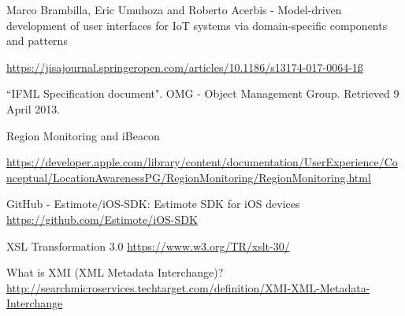 

\begin{thebibliography}{90}

Marco Brambilla, Eric Umuhoza and Roberto Acerbis - Model-driven development of user interfaces for IoT systems via domain-specific components and patterns

\url{https://jisajournal.springeropen.com/articles/10.1186/s13174-017-0064-1ß}
    
``IFML Specification document". OMG - Object Management Group. Retrieved 9 April 2013.

Region Monitoring and iBeacon

\url{https://developer.apple.com/library/content/documentation/UserExperience/Conceptual/LocationAwarenessPG/RegionMonitoring/RegionMonitoring.html}
    
GitHub - Estimote/iOS-SDK: Estimote SDK for iOS devices
\url{https://github.com/Estimote/iOS-SDK}

XSL Transformation 3.0 
\url{https://www.w3.org/TR/xslt-30/}

What is XMI (XML Metadata Interchange)?
\url{http://searchmicroservices.techtarget.com/definition/XMI-XML-Metadata-Interchange}

\end{thebibliography}


